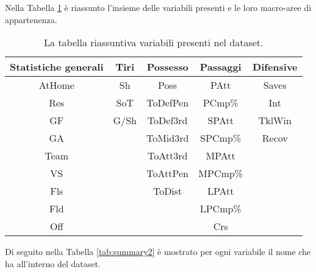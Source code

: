 Nella Tabella \ref{tab:summary} è riassunto l'insieme delle variabili presenti e le loro macro-aree di appartenenza.\\
	\begin{table}[!htb]%
	
	\renewcommand{\arraystretch}{1.7}
	\centering
	\begin{tabular}{c c c c c}
		\hline	
		
		\textbf{Statistiche generali} & \textbf{Tiri} & \textbf{Possesso} & \textbf{Passaggi} & \textbf{Difensive} \\	
		\hline			
		AtHome & Sh & Poss & PAtt & Saves\\
		Res & SoT & ToDefPen & PCmp\% & Int\\
		GF & G/Sh & ToDef3rd & SPAtt & TklWin\\
		GA &  & ToMid3rd & SPCmp\% & Recov\\
		Team &  & ToAtt3rd & MPAtt&\\
		VS &  & ToAttPen & MPCmp\% &\\
		Fls &  & ToDist & LPAtt &\\
		Fld &  &  & LPCmp\% &\\
		Off &  &  & Crs \\
		\hline

		
	\end{tabular} \hbox{}
	
	\caption{La tabella riassuntiva variabili presenti nel dataset.} \label{tab:summary}
\end{table}

Di seguito nella Tabella \ref{tab:summary2} è mostrato per ogni variabile il nome che ha all'interno del dataset.


